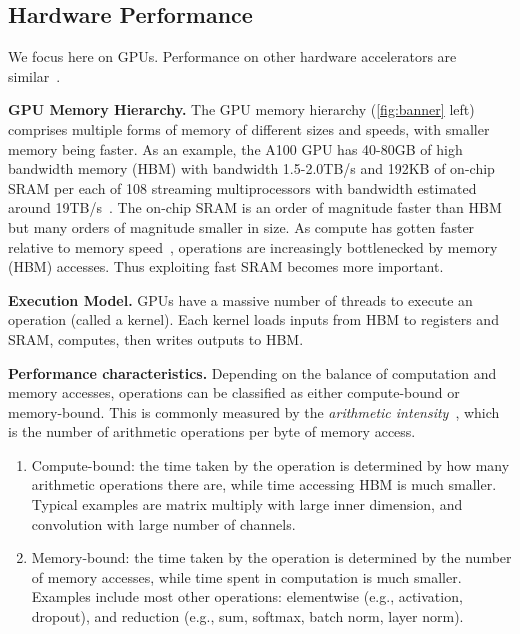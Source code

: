 \documentclass{article}
\begin{document}
\subsection{Hardware Performance}
\label{subsec:hardware}

We focus here on GPUs.
Performance on other hardware accelerators are similar~\citep{jouppi2017datacenter, jia2019dissecting}.

\textbf{GPU Memory Hierarchy.}
The GPU memory hierarchy (\cref{fig:banner} left) comprises multiple forms of memory of different
sizes and speeds, with smaller memory being faster.
As an example, the A100 GPU has 40-80GB of high bandwidth memory (HBM) with
bandwidth 1.5-2.0TB/s and 192KB of on-chip SRAM per each of 108 streaming
multiprocessors with
bandwidth estimated around 19TB/s~\citep{jia2018dissecting, jia2021dissecting}.
The on-chip SRAM is an order of magnitude faster than HBM but many orders of
magnitude smaller in size.
As compute has gotten faster relative to memory speed~\citep{nvidia2017nvidia,nvidia2020nvidia,nvidia2022nvidia}, operations
are increasingly bottlenecked by memory (HBM) accesses.
Thus exploiting fast SRAM becomes more important.

\textbf{Execution Model.}
GPUs have a massive number of threads to execute an operation
(called a kernel).
Each kernel loads inputs from HBM to registers and SRAM, computes, then writes outputs to HBM.

\textbf{Performance characteristics.} Depending on the balance of computation and memory accesses, operations can be
classified as either compute-bound or memory-bound.
This is commonly measured by the \emph{arithmetic intensity}~\citep{williams2009roofline},
which is the number of arithmetic operations per byte of memory access.
\begin{enumerate}[itemsep=0.1pt,topsep=0pt,leftmargin=*]
  \item Compute-bound: the time taken by the operation is determined by how many
  arithmetic operations there are, while time accessing HBM
  is much smaller. Typical examples are matrix multiply with large inner
  dimension, and convolution with large number of channels.
  \item Memory-bound: the time taken by the operation is determined by the
  number of memory accesses, while time spent in computation is much smaller.
  Examples include most other operations:
  elementwise (e.g., activation, dropout), and reduction (e.g., sum,
  softmax, batch norm, layer norm).
\end{enumerate}
\end{document}
